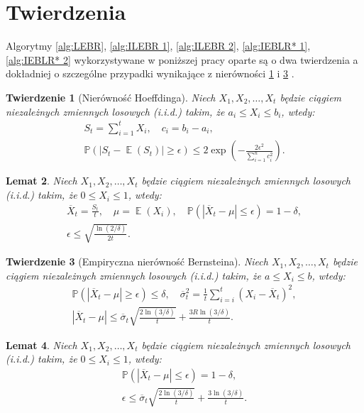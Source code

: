 \documentclass[inzynierska]{pwr_wmat_praca_dyplomowa}
\theoremstyle{plain}
\newtheorem{theorem}{Twierdzenie}
\numberwithin{theorem}{chapter}
\newtheorem{lemma}[theorem]{Lemat}
\theoremstyle{definition}
\numberwithin{theorem}{chapter}
\DeclareMathOperator{\EX}{\mathbb{E}}%
\newcommand{\probP}{\mathbb{P}}
\begin{document}
	\section{Twierdzenia}
	Algorytmy \ref{alg:LEBR}, \ref{alg:ILEBR 1}, \ref{alg:ILEBR 2}, \ref{alg:IEBLR* 1}, \ref{alg:IEBLR* 2} wykorzystywane w poniższej pracy oparte są o dwa twierdzenia a dokładniej o szczególne przypadki wynikające z nierówności \ref{Hoeffding ineq} i \ref{Bernsteina emp ineq}  \cite{heidrich2011non}.
	\begin{theorem}[Nierówność Hoeffdinga]
		\label{Hoeffding ineq}
		Niech $X_1, X_2, \dots, X_t$ będzie ciągiem niezależnych zmiennych losowych (i.i.d.) takim, że $a_i \le X_i \le b_i$, wtedy:
		\begin{gather*}
			S_t = \sum_{i=1}^{t} X_i, \quad c_i = b_i - a_i,  \\
			\probP(|S_t - \EX(S_t)| \ge \epsilon ) \le 2\exp\left( -\frac{2\epsilon^2}{\sum_{i=1}^{n} c_i^2} \right).
		\end{gather*}
	\end{theorem}
	\begin{lemma}
		\label{Hoeffding ineq lemma}
		Niech $X_1, X_2, \dots, X_t$ będzie ciągiem niezależnych zmiennych losowych (i.i.d.) takim, że $0 \le X_i \le 1$, wtedy:
		\begin{gather*}
			\overline{X}_t = \frac{S_t}{t},\quad 
			\mu = \EX(X_i), \quad  	
			\probP(|\overline{X}_t - \mu | \le \epsilon ) = 1 - \delta,  \\
			\epsilon \le  \sqrt{\frac{\ln(2/\delta)}{2t}} .
		\end{gather*}
	\end{lemma}
	\begin{theorem}[Empiryczna nierówność Bernsteina]
		\label{Bernsteina emp ineq}
		Niech $X_1, X_2, \dots, X_t$ będzie ciągiem niezależnych zmiennych losowych (i.i.d.) takim, że $a \le X_i \le b$, wtedy:
		\begin{gather*}
			\probP(|\overline{X}_t - \mu| \ge \epsilon ) \le  \delta,\quad \overline \sigma_t^2 = \frac{1}{t}\sum_{i=i}^{t}(X_i - \overline{X}_t)^2, \\
			|\overline{X}_t - \mu | \le \overline{\sigma}_t \sqrt{\frac{2\ln(3/\delta)}{t}} + \frac{3 R \ln{(3 / \delta)}}{t}.
		\end{gather*}
	\end{theorem}
	\begin{lemma}\label{Bernsteina emp ineq lemma}
		Niech $X_1, X_2, \dots, X_t$ będzie ciągiem niezależnych zmiennych losowych (i.i.d.) takim, że $0 \le X_i \le 1$, wtedy:
		\begin{gather*}
			\probP(|\overline{X}_t - \mu | \le \epsilon ) = 1 - \delta, \\
			\epsilon \le \overline{\sigma}_t \sqrt{\frac{2\ln(3/\delta)}{t}} + \frac{3  \ln{(3 / \delta)}}{t}.
		\end{gather*}
	\end{lemma}
\end{document}
